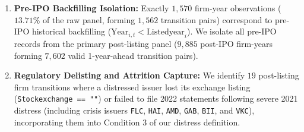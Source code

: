 \documentclass[pdflatex,sn-mathphys-num,twocolumn]{sn-jnl}
\theoremstyle{thmstyleone}
\theoremstyle{thmstyletwo}
\theoremstyle{thmstylethree}
\begin{document}
\begin{enumerate}
\begin{equation}
\begin{aligned}
        &= 0.852993,
    \end{aligned}
    \end{equation}
    and define clean interest expense as $I_{i,t} = |\text{interestexp}_{i,t}|$ when observed, and $\kappa_{\text{train}} F_{i,t}$ otherwise. Crucially, we prove that defining $\text{EBIT}_{\text{naive}} = \text{NetProfit}_{i,t} + I_{i,t}$ reduces the condition $\text{ICR}_{\text{naive}} = \text{EBIT}_{\text{naive}} / I_{i,t} < 1.0$ to $\text{NetProfit}_{i,t} < 0$, creating a $100\%$ algebraic tautology. We eliminate this tautology by reconstructing true Operating EBIT from top-line accounting identities:
    \begin{align}
        \text{EBIT}_{\text{op}, i, t} &= \text{NetSales}_{i,t} - C_{i,t} - S_{i,t} - A_{i,t}, \\
        \text{ICR}_{\text{op}, i, t} &= \frac{\text{EBIT}_{\text{op}, i, t}}{I_{i,t} + \epsilon},
    \end{align}
    where $\epsilon = 1.0$ VND prevents division by zero for debt-free firms.
    \item \textbf{Pre-IPO Backfilling Isolation:} Exactly $1,570$ firm-year observations ($13.71\%$ of the raw panel, forming $1,562$ transition pairs) correspond to pre-IPO historical backfilling ($\text{Year}_{i,t} < \text{Listedyear}_i$). We isolate all pre-IPO records from the primary post-listing panel ($9,885$ post-IPO firm-years forming $7,602$ valid 1-year-ahead transition pairs).
    \item \textbf{Regulatory Delisting and Attrition Capture:} We identify $19$ post-listing firm transitions where a distressed issuer lost its exchange listing (\texttt{Stockexchange == ""}) or failed to file 2022 statements following severe 2021 distress (including crisis issuers \texttt{FLC}, \texttt{HAI}, \texttt{AMD}, \texttt{GAB}, \texttt{BII}, and \texttt{VKC}), incorporating them into Condition 3 of our distress definition.
\end{enumerate}
\end{document}
